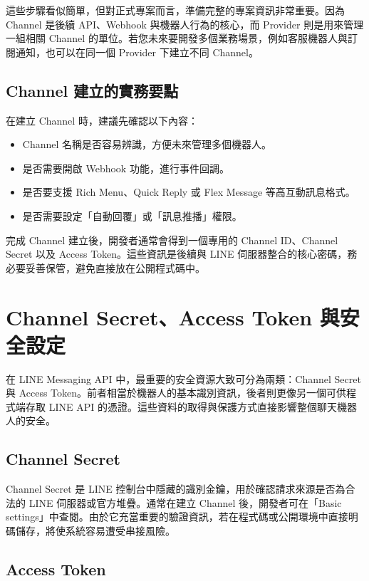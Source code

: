 這些步驟看似簡單，但對正式專案而言，準備完整的專案資訊非常重要。因為 Channel 是後續 API、Webhook 與機器人行為的核心，而 Provider 則是用來管理一組相關 Channel 的單位。若您未來要開發多個業務場景，例如客服機器人與訂閱通知，也可以在同一個 Provider 下建立不同 Channel。

\section{Channel 建立的實務要點}

在建立 Channel 時，建議先確認以下內容：

\begin{itemize}[leftmargin=2em]
    \item Channel 名稱是否容易辨識，方便未來管理多個機器人。
    \item 是否需要開啟 Webhook 功能，進行事件回調。
    \item 是否要支援 Rich Menu、Quick Reply 或 Flex Message 等高互動訊息格式。
    \item 是否需要設定「自動回覆」或「訊息推播」權限。
\end{itemize}

完成 Channel 建立後，開發者通常會得到一個專用的 Channel ID、Channel Secret 以及 Access Token。這些資訊是後續與 LINE 伺服器整合的核心密碼，務必要妥善保管，避免直接放在公開程式碼中。

\chapter{Channel Secret、Access Token 與安全設定}

在 LINE Messaging API 中，最重要的安全資源大致可分為兩類：Channel Secret 與 Access Token。前者相當於機器人的基本識別資訊，後者則更像另一個可供程式端存取 LINE API 的憑證。這些資料的取得與保護方式直接影響整個聊天機器人的安全。

\section{Channel Secret}

Channel Secret 是 LINE 控制台中隱藏的識別金鑰，用於確認請求來源是否為合法的 LINE 伺服器或官方堆疊。通常在建立 Channel 後，開發者可在「Basic settings」中查閱。由於它充當重要的驗證資訊，若在程式碼或公開環境中直接明碼儲存，將使系統容易遭受串接風險。

\section{Access Token}

